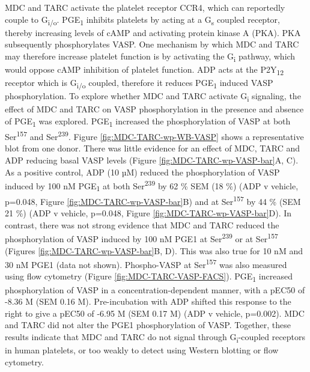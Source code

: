 \documentclass[11pt,twoside]{bristolthesis}
\begin{document}
MDC and TARC activate the platelet receptor CCR4, which can reportedly couple to G\textsubscript{i/o}. PGE\textsubscript{1} inhibits platelets by acting at a G\textsubscript{s} coupled receptor, thereby increasing levels of cAMP and activating protein kinase A (PKA). PKA subsequently phosphorylates VASP. One mechanism by which MDC and TARC may therefore increase platelet function is by activating the G\textsubscript{i} pathway, which would oppose cAMP inhibition of platelet function. ADP acts at the P2Y\textsubscript{12} receptor which is G\textsubscript{i/o} coupled, therefore it reduces PGE\textsubscript{1} induced VASP phosphorylation. To explore whether MDC and TARC activate G\textsubscript{i} signaling, the effect of MDC and TARC on VASP phosphorylation in the presence and absence of PGE\textsubscript{1} was explored. PGE\textsubscript{1} increased the phosphorylation of VASP at both Ser\textsuperscript{157} and Ser\textsuperscript{239}. Figure \ref{fig:MDC-TARC-wp-WB-VASP} shows a representative blot from one donor. There was little evidence for an effect of MDC, TARC and ADP reducing basal VASP levels (Figure \ref{fig:MDC-TARC-wp-VASP-bar}A, C). As a positive control, ADP (10 µM) reduced the phosphorylation of VASP induced by 100 nM PGE\textsubscript{1} at both Ser\textsuperscript{239} by 62 \% SEM (18 \%) (ADP v vehicle, p=0.048, Figure \ref{fig:MDC-TARC-wp-VASP-bar}B) and at Ser\textsuperscript{157} by 44 \% (SEM 21 \%) (ADP v vehicle, p=0.048, Figure \ref{fig:MDC-TARC-wp-VASP-bar}D). In contrast, there was not strong evidence that MDC and TARC reduced the phosphorylation of VASP induced by 100 nM PGE1 at Ser\textsuperscript{239} or at Ser\textsuperscript{157} (Figures \ref{fig:MDC-TARC-wp-VASP-bar}B, D). This was also true for 10 nM and 30 nM PGE1 (data not shown). Phospho-VASP at Ser\textsuperscript{157} was also measured using flow cytometry (Figure \ref{fig:MDC-TARC-VASP-FACS}). PGE\textsubscript{1} increased phosphorylation of VASP in a concentration-dependent manner, with a pEC50 of -8.36 M (SEM 0.16 M). Pre-incubation with ADP shifted this response to the right to give a pEC50 of -6.95 M (SEM 0.17 M) (ADP v vehicle, p=0.002). MDC and TARC did not alter the PGE1 phosphorylation of VASP. Together, these results indicate that MDC and TARC do not signal through G\textsubscript{i}-coupled receptors in human platelets, or too weakly to detect using Western blotting or flow cytometry.
\end{document}
